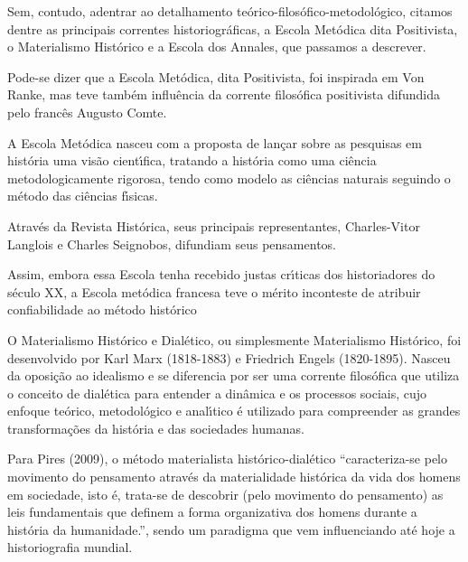 \documentclass[
12pt,		%
openright,	%
twoside,  %
a4paper,			%
chapter=TITLE,		%
english,			%
french,				%
spanish,			%
brazil				%
]{USPSC-classe/USPSC}
\begin{document}
Sem, contudo, adentrar ao detalhamento te\'orico-filos\'ofico-metodol\'ogico, citamos dentre as principais correntes historiogr\'aficas, a Escola Met\'odica dita Positivista, o Materialismo Hist\'orico e a Escola dos Annales, que passamos a descrever.


Pode-se dizer que a Escola Met\'odica, dita Positivista, foi inspirada em Von Ranke, mas teve tamb\'em influ\^encia da corrente filos\'ofica positivista difundida pelo franc\^es Augusto Comte.


A Escola Met\'odica nasceu com a proposta de  lan\c{c}ar sobre as pesquisas em hist\'oria uma vis\~ao cient\'{\i}fica, tratando a hist\'oria como uma ci\^encia metodologicamente rigorosa, tendo como modelo as ci\^encias naturais seguindo o m\'etodo das ci\^encias f\'{\i}sicas.


Atrav\'es da Revista Hist\'orica, seus principais representantes, Charles-Vitor Langlois e Charles Seignobos, difundiam seus pensamentos.



\noindent\begin{center}\mbox{\centering{}}\end{center}


Assim, embora essa Escola tenha recebido justas cr\'{\i}ticas dos historiadores do s\'eculo XX, a Escola met\'odica francesa teve o m\'erito inconteste de atribuir confiabilidade ao m\'etodo hist\'orico


O Materialismo Hist\'orico e Dial\'etico, ou simplesmente Materialismo Hist\'orico, foi desenvolvido  por Karl Marx (1818-1883) e Friedrich Engels (1820-1895). Nasceu da oposi\c{c}\~ao ao idealismo e se diferencia por ser uma corrente filos\'ofica que utiliza o conceito de dial\'etica para entender a din\^amica e os processos sociais, cujo enfoque te\'orico, metodol\'ogico e anal\'{\i}tico \'e utilizado para compreender as grandes transforma\c{c}\~oes da hist\'oria e das sociedades humanas.


Para  Pires (2009), o m\'etodo materialista hist\'orico-dial\'etico “caracteriza-se pelo movimento do pensamento atrav\'es da materialidade hist\'orica da vida dos homens em sociedade, isto \'e, trata-se de descobrir (pelo movimento do pensamento) as leis fundamentais que definem a forma organizativa dos homens durante a hist\'oria da humanidade.”, sendo um paradigma que vem influenciando at\'e hoje a historiografia mundial.
\end{document}
